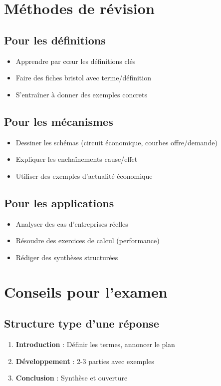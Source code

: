 \documentclass[12pt,a4paper]{article}
\begin{document}
\section{Méthodes de révision}

\subsection{Pour les définitions}
\begin{itemize}
    \item Apprendre par cœur les définitions clés
    \item Faire des fiches bristol avec terme/définition
    \item S'entraîner à donner des exemples concrets
\end{itemize}

\subsection{Pour les mécanismes}
\begin{itemize}
    \item Dessiner les schémas (circuit économique, courbes offre/demande)
    \item Expliquer les enchaînements cause/effet
    \item Utiliser des exemples d'actualité économique
\end{itemize}

\subsection{Pour les applications}
\begin{itemize}
    \item Analyser des cas d'entreprises réelles
    \item Résoudre des exercices de calcul (performance)
    \item Rédiger des synthèses structurées
\end{itemize}

\section{Conseils pour l'examen}

\subsection{Structure type d'une réponse}
\begin{enumerate}
    \item \textbf{Introduction} : Définir les termes, annoncer le plan
    \item \textbf{Développement} : 2-3 parties avec exemples
    \item \textbf{Conclusion} : Synthèse et ouverture
\end{enumerate}
\end{document}
